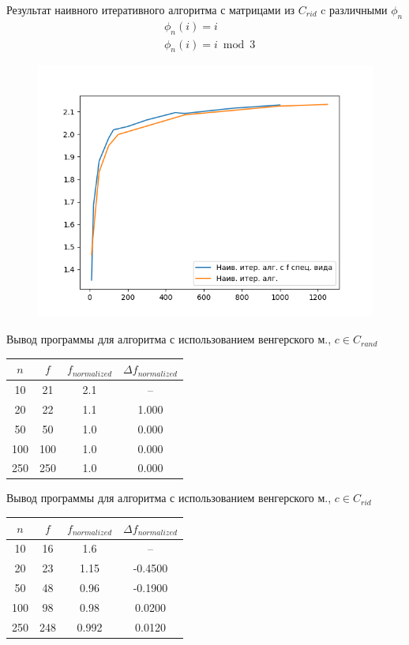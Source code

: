 \documentclass[12pt]{beamer}
\begin{document}
\begin{frame}{Результат наивного итеративного алгоритма с матрицами из $C_{rid}$ c различными $\phi_n$}
\begin{eqnarray}
& \phi_n(i) = i \\
 & \phi_n(i) = i \bmod 3
\end{eqnarray}
\begin{figure}
\includegraphics[scale=0.34]{f_vs_nonf.png}
\end{figure}
\end{frame}

\begin{frame}{Вывод программы для алгоритма с использованием венгерского м., $c \in C_{rand}$}
\begin{tabular}{|c|c|c|c|}
\hline $n$ & $f$ & $f_{normalized}$ & $\Delta f_{normalized}$ \\
\hline 10   &  21  & 2.1 & --    \\
\hline 20   &  22  & 1.1 & 1.000 \\
\hline 50   &  50  & 1.0 & 0.000 \\
\hline 100  &  100 & 1.0 & 0.000 \\
\hline 250  &  250 & 1.0 & 0.000 \\ 
\hline
\end{tabular}
\end{frame}

\begin{frame}{Вывод программы для алгоритма с использованием венгерского м., $c \in C_{rid}$}
\begin{tabular}{|c|c|c|c|}
\hline $n$ & $f$ & $f_{normalized}$ & $\Delta f_{normalized}$ \\
\hline 10   & 16  & 1.6   & --  		\\
\hline 20   & 23  & 1.15  & -0.4500 	\\
\hline 50   & 48  & 0.96  & -0.1900 	\\
\hline 100  & 98  & 0.98  & 0.0200 		\\
\hline 250  & 248 & 0.992 & 0.0120 		\\
\hline
\end{tabular}
\end{frame}
\end{document}
